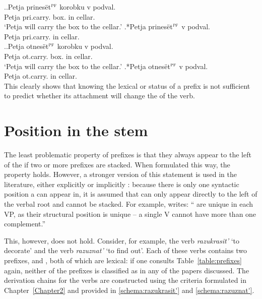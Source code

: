\ex.\label{ex:prinesti}\ag.Petja prines\"{e}t$^{\textsc{pf}}$ korobku v podval.\\
Petja pri.carry. box. in cellar.\\
\trans `Petja will carry the box to the cellar.'
\bg.*Petja prines\"{e}t$^{\textsc{pf}}$ v podval.\\
Petja pri.carry. in cellar.\\

\ex.\label{ex:otnesti}\ag.Petja otnes\"{e}t$^{\textsc{pf}}$ korobku v podval.\\
Petja ot.carry. box. in cellar.\\
\trans `Petja will carry the box to the cellar.'
\bg.*Petja otnes\"{e}t$^{\textsc{pf}}$ v podval.\\
Petja ot.carry. in cellar.\\

This clearly shows that knowing the lexical or  status of a prefix is not sufficient to predict whether its attachment will change the  of the  verb.
\section{Position in the stem}\label{section:new:position}
The least problematic property of  prefixes is that they always appear to the left of the  if two or more prefixes are stacked. When formulated this way, the property holds. However, a stronger version of this statement is used in the literature, either explicitly \citep{Svenonius:04b} or implicitly \citep{Tatevosov:09}: because there is only one syntactic position a  can appear in, it is assumed that  can only appear directly to the left of the verbal root and cannot be stacked. For example, \citet[206]{Svenonius:04b} writes: `` are unique in each VP, as their structural position is unique -- a single V cannot have more than one  complement.''


This, however, does not hold. Consider, for example, the verb \textit{razukrasit'} `to decorate' and the verb \textit{razuznat'} `to find out'. Each of these verbs contains two prefixes,  and , both of which are lexical: if one consults Table~\ref{table:prefixes} again, neither of the prefixes is classified as  in any of the papers discussed. The derivation chains for the verbs are constructed using the criteria formulated in Chapter~\ref{Chapter2} and provided in \ref{schema:razukrasit'} and \ref{schema:razuznat'}.

